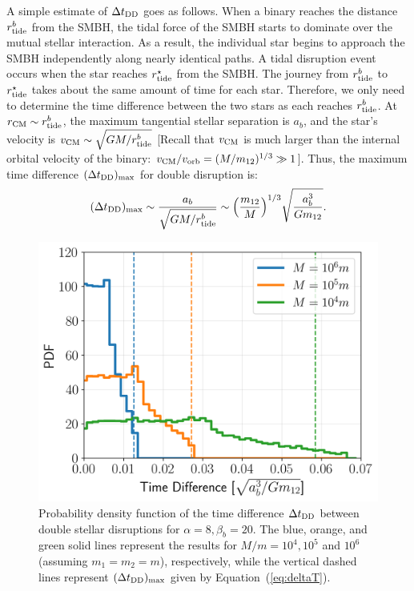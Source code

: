 \documentclass[twocolumn]{aastex631}
\begin{document}
A simple estimate of $\Delta t_{\rm DD}$ goes as follows. 
When a binary reaches the distance $r_{\rm tide}^b$ from the SMBH, the tidal force of the SMBH starts to dominate over the mutual stellar interaction. 
As a result, the individual star begins to approach the SMBH independently along nearly identical paths. 
A tidal disruption event occurs when the star reaches $r_{\rm tide}^\star$ from the SMBH. 
The journey from $r_{\rm tide}^b$ to $r_{\rm tide}^\star$ takes about the same amount of time for each star. 
Therefore, we only need to determine the time difference between the two stars as each reaches $r_{\rm tide}^b$.
At $r_{\rm CM} \sim r_{\rm tide}^b$, the maximum tangential stellar separation is $a_b$, and the star's velocity is $v_{\rm CM} \sim \sqrt{GM/r_{\rm tide}^b}$ [Recall that $v_{\rm CM}$ is much larger than the internal orbital velocity of the binary: $v_{\rm CM}/v_{\rm orb}=(M/m_{12})^{1/3} \gg 1$]. 
Thus, the maximum time difference $(\Delta t_{\rm DD})_{\rm max}$ for double disruption is:
\begin{equation}
(\Delta t_{\rm DD})_{\rm max} \sim \frac{a_b}{\sqrt{GM/r_{\rm tide}^b}}\sim \Bigl(\frac{m_{12}}{M}\Bigr)^{1/3}\sqrt{\frac{a_b^3}{Gm_{12}}}.
\label{eq:deltaT}
\end{equation}

\begin{figure}[htbp]
\centering
\includegraphics[width=1.02\columnwidth]{figures/DoubleTDE_dT.png}
\caption{
Probability density function of the time difference $\Delta t_{\rm DD}$ between double stellar disruptions for $\alpha = 8, \beta_b = 20$.
The blue, orange, and green solid lines represent the results for $M/m=10^4, 10^5$ and $10^6$ (assuming $m_1=m_2=m$), respectively, while the vertical dashed lines represent $(\Delta t_{\rm DD})_{\rm max}$ given by Equation~(\ref{eq:deltaT}).}
\label{Fig:deltaT}
\end{figure}
\end{document}
